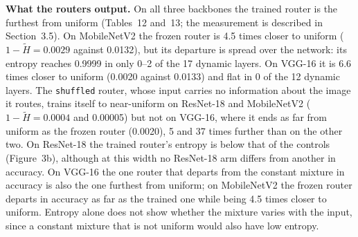 \documentclass{article}
\begin{document}
\textbf{What the routers output.}  On all three backbones the trained
router is the furthest from uniform (Tables~12
and~13; the measurement is described in
Section~3.5). On MobileNetV2 the frozen router is
4.5 times closer to uniform ($1-\tilde H=0.0029$ against
0.0132), but its departure is spread over the network: its entropy
reaches 0.9999 in only 0--2 of the 17 dynamic layers.
On VGG-16 it is 6.6 times closer to uniform (0.0020 against
0.0133) and flat in 0 of the 12 dynamic layers.
The \texttt{shuffled} router, whose input carries no information about the
image it routes, trains itself to near-uniform on ResNet-18 and MobileNetV2
($1-\tilde H=0.0004$ and 0.00005) but not on VGG-16, where it ends
as far from uniform as the frozen router (0.0020), 5
and 37 times further than on the other two. On ResNet-18 the
trained router's entropy is below that of the controls
(Figure~3b), although at this width no ResNet-18 arm differs
from another in accuracy. On VGG-16 the one router that departs from the
constant mixture in accuracy is also the one furthest from uniform; on
MobileNetV2 the frozen router departs in accuracy as far as the trained
one while being 4.5 times closer to uniform. Entropy alone does
not show whether the mixture varies with the input, since a constant
mixture that is not uniform would also have low entropy.
\end{document}
